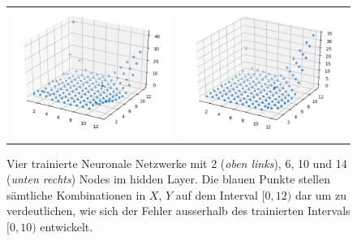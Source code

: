 \begin{figure}
\begin{tabular}{cc}
		\includegraphics[scale=0.4]{learning/img/abs_plot_10_clean.png} &
		\includegraphics[scale=0.4]{learning/img/abs_plot_14_clean.png} \\				
	\end{tabular}
	\caption{Vier trainierte Neuronale Netzwerke mit 2 (\textit{oben
	links}), 6, 10 und 14 (\textit{unten rechts}) Nodes im
	hidden Layer. Die blauen Punkte stellen sämtliche Kombinationen
	in $X$, $Y$ auf dem Interval $[0,12)$ dar um zu verdeutlichen,
	wie sich der Fehler ausserhalb des trainierten Intervals
	$[0,10)$ entwickelt.
	\label{fig:mst_multiplicator_error} }
\end{figure}

